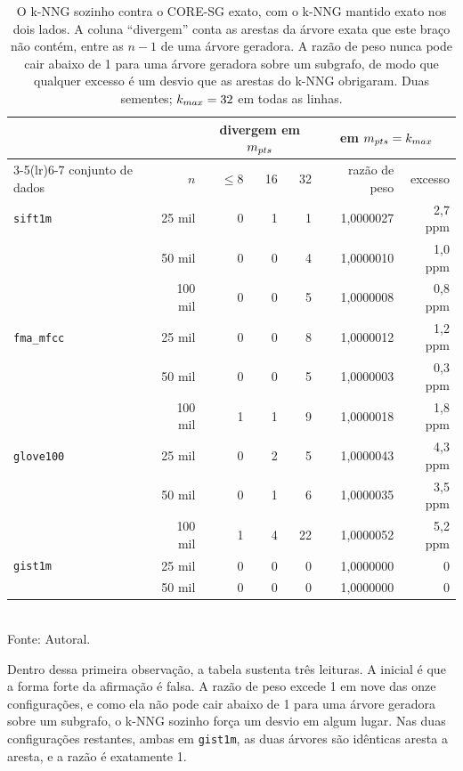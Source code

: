 \begin{table}[htb!]
\caption{\label{tab:ablation} O \ac{k-NNG} sozinho contra o \ac{CORE-SG} exato, com o \ac{k-NNG} mantido exato nos dois lados. A coluna ``divergem'' conta as arestas da árvore exata que este braço não contém, entre as $n-1$ de uma árvore geradora. A razão de peso nunca pode cair abaixo de 1 para uma árvore geradora sobre um subgrafo, de modo que qualquer excesso é um desvio que as arestas do \ac{k-NNG} obrigaram. Duas sementes; $k_{max} = 32$ em todas as linhas.}
\centering
\footnotesize
\begin{tabular}{@{}lrrrrrr@{}}
\toprule
 & & \multicolumn{3}{c}{divergem em $m_{pts}$} & \multicolumn{2}{c}{em $m_{pts} = k_{max}$} \\
\cmidrule(lr){3-5}\cmidrule(lr){6-7}
conjunto de dados & $n$ & $\le 8$ & 16 & 32 & razão de peso & excesso \\
\midrule
\texttt{sift1m}    & 25 mil  & 0 & 1 & 1  & 1,0000027 & 2,7 ppm \\
                   & 50 mil  & 0 & 0 & 4  & 1,0000010 & 1,0 ppm \\
                   & 100 mil & 0 & 0 & 5  & 1,0000008 & 0,8 ppm \\
\texttt{fma\_mfcc} & 25 mil  & 0 & 0 & 8  & 1,0000012 & 1,2 ppm \\
                   & 50 mil  & 0 & 0 & 5  & 1,0000003 & 0,3 ppm \\
                   & 100 mil & 1 & 1 & 9  & 1,0000018 & 1,8 ppm \\
\texttt{glove100}  & 25 mil  & 0 & 2 & 5  & 1,0000043 & 4,3 ppm \\
                   & 50 mil  & 0 & 1 & 6  & 1,0000035 & 3,5 ppm \\
                   & 100 mil & 1 & 4 & 22 & 1,0000052 & 5,2 ppm \\
\midrule
\texttt{gist1m}    & 25 mil  & 0 & 0 & 0  & 1,0000000 & 0 \\
                   & 50 mil  & 0 & 0 & 0  & 1,0000000 & 0 \\
\bottomrule
\end{tabular}\\
Fonte: Autoral.
\end{table}

Dentro dessa primeira observação, a tabela sustenta três leituras. A inicial é que a forma forte da afirmação é falsa. A razão de peso excede 1 em nove das onze configurações, e como ela não pode cair abaixo de 1 para uma árvore geradora sobre um subgrafo, o \ac{k-NNG} sozinho força um desvio em algum lugar. Nas duas configurações restantes, ambas em \texttt{gist1m}, as duas árvores são idênticas aresta a aresta, e a razão é exatamente 1.\\

